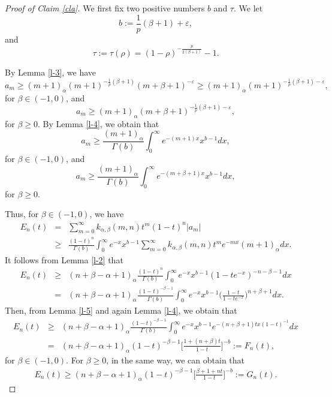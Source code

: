 \documentclass[10pt]{amsart}
\theoremstyle{definition}
\theoremstyle{question}
\numberwithin{equation}{section}
\begin{document}
\begin{proof}[Proof of Claim \ref{cla}]
We first fix two positive numbers $b$ and $\tau$. We let $$b:=\frac{1}{p}(\beta+1)+\varepsilon,$$
and 
$$\tau:=\tau(\rho)=(1-\rho)^{-\frac{p}{2(\beta+1)}}-1.$$

By Lemma \ref{l-3}, we have
\begin{equation}\label{eq-1}
  a_m \geq (m+1)_{\alpha} (m+1)^{-\frac{1}{p}(\beta+1)}{(m+\beta+1)^{-\varepsilon}}\geq (m+1)_{\alpha} (m+1)^{-\frac{1}{p}(\beta+1)-\varepsilon}, \nonumber
\end{equation}
for $\beta\in (-1,0)$, and 
\begin{equation} \label{eq-2}
  a_m \geq (m+1)_{\alpha} (m+\beta+1)^{-\frac{1}{p}(\beta+1)-\varepsilon},\nonumber
\end{equation}
for $\beta\geq 0$. 
By Lemma \ref{l-4}, we obtain that 
$$a_m\geq \frac{(m+1)_{\alpha}}{\Gamma(b)}\int_{0}^{\infty}e^{-(m+1)x}x^{b-1}dx,$$
for $\beta\in (-1,0)$, and 
$$a_m\geq \frac{(m+1)_{\alpha}}{\Gamma(b)}\int_{0}^{\infty}e^{-(m+\beta+1)x}x^{b-1}dx,$$
for $\beta\geq 0$. 

Thus, for $\beta\in (-1,0)$,  we have
\begin{eqnarray}
E_n(t)&=&\sum_{m=0}^{\infty}k_{\alpha, \beta}(m,n)t^m (1-t)^n |a_m| \nonumber \\
&\geq & \frac{(1-t)^n}{\Gamma(b)}\int_{0}^{\infty} e^{-x} x^{b-1} \sum_{m=0}^{\infty}k_{\alpha, \beta}(m,n)t^m e^{-mx}(m+1)_{\alpha}dx.  \nonumber
\end{eqnarray}
It follows from Lemma \ref{l-2} that
\begin{eqnarray}
E_n(t)&\geq &(n+\beta-\alpha+1)_{\alpha}\frac{(1-t)^n}{\Gamma(b)}\int_{0}^{\infty} e^{-x} x^{b-1} (1-te^{-x})^{-n-\beta-1}dx \nonumber \\
&=&(n+\beta-\alpha+1)_{\alpha} \frac{(1-t)^{-\beta-1}}{\Gamma(b)}\int_{0}^{\infty} e^{-x} x^{b-1} \Big(\frac{1-t}{1-te^{-x}}\Big)^{n+\beta+1}dx. \nonumber 
\end{eqnarray}
Then, from Lemma \ref{l-5} and again Lemma \ref{l-4}, we obtain that
\begin{eqnarray}\label{e-1}
E_n(t)&\geq & (n+\beta-\alpha+1)_{\alpha}\frac{(1-t)^{-\beta-1}}{\Gamma(b)}\int_{0}^{\infty} e^{-x} x^{b-1} e^{-(n+\beta+1)t x {(1-t)}^{-1}}dx  \nonumber \\
&=&(n+\beta-\alpha+1)_{\alpha}(1-t)^{-\beta-1}\Big[\frac{1+(n+\beta)t}{1-t}\Big]^{-b}:=F_{n}(t),
\end{eqnarray}
for $\beta\in (-1,0)$. For $\beta\geq 0$, in the same way, we can obtain that
\begin{eqnarray}\label{e-2}
E_n(t)\geq (n+\beta-\alpha+1)_{\alpha}(1-t)^{-\beta-1}\Big[\frac{\beta+1+nt}{1-t}\Big]^{-b}:=G_{n}(t).
\end{eqnarray}


\end{proof}
\end{document}
